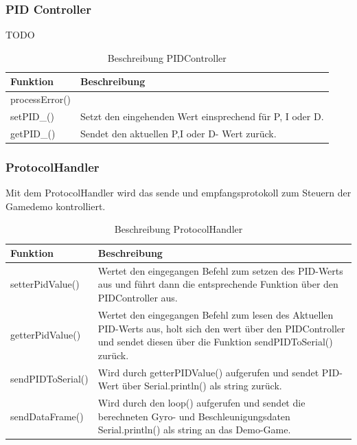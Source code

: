 \subsubsection{PID Controller}
TODO
\begin{table}[H]
  \centering
  \settowidth{}
  \setlength\extrarowheight{2pt}
  \begin{tabulary}{1.0\textwidth}{|L|L|}
    \hline
    \textbf{Funktion} &
    \textbf{Beschreibung}\\
    \hline
    processError() & \\
    \hline
    setPID\_() & Setzt den eingehenden Wert einsprechend für P, I oder D. \\
    \hline
    getPID\_() & Sendet den aktuellen P,I oder D- Wert zurück.\\
    \hline
  \end{tabulary}
  \caption{Beschreibung PIDController}
\end{table}


\subsubsection{ProtocolHandler}
Mit dem ProtocolHandler wird das sende und empfangsprotokoll zum Steuern der Gamedemo kontrolliert.
\begin{table}[H]
  \centering
  \settowidth{}
  \setlength\extrarowheight{2pt}
  \begin{tabulary}{1.0\textwidth}{|L|L|}
    \hline
    \textbf{Funktion} &
    \textbf{Beschreibung}\\
    \hline
    setterPidValue() &
    Wertet den eingegangen Befehl zum setzen des PID-Werts aus und führt dann die entsprechende Funktion über den PIDController aus. \\
    \hline
    getterPidValue() &
    Wertet den eingegangen Befehl zum lesen des Aktuellen PID-Werts aus, holt sich den wert über den PIDController und sendet diesen über die Funktion sendPIDToSerial() zurück.\\
    \hline
    sendPIDToSerial() & 
    Wird durch getterPIDValue() aufgerufen und sendet PID-Wert über Serial.println() als string zurück.\\
    \hline
    sendDataFrame() &
    Wird durch den loop() aufgerufen und sendet die berechneten Gyro- und Beschleunigungsdaten Serial.println() als string an das Demo-Game.\\
    \hline
  \end{tabulary}
  \caption{Beschreibung ProtocolHandler}
\end{table}

\newpage